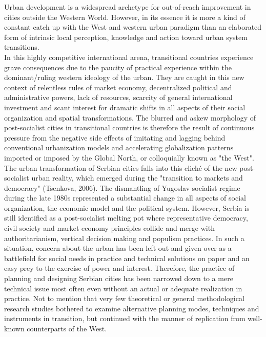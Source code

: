 \documentclass[11pt]{report}
\begin{document}
Urban development is a widespread archetype for out-of-reach improvement in cities outside the Western World. However, in its essence it is more a kind of constant catch up with the West and western urban paradigm than an elaborated form of intrinsic local perception, knowledge and action toward urban system transitions. 
\\
In this highly competitive international arena, transitional countries experience grave consequences due to the paucity of practical experience within the dominant/ruling western ideology of the urban. They are caught in this new context of relentless rules of market economy, decentralized political and administrative powers, lack of resources, scarcity of general international investment and scant interest for dramatic shifts in all aspects of their social organization and spatial transformations. The blurred and askew morphology of post-socialist cities in transitional countries is therefore the result of continuous pressure from the negative side effects of imitating and lagging behind conventional urbanization models and accelerating globalization patterns imported or imposed by the Global North, or colloquially known as "the West".
\\
The urban transformation of Serbian cities falls into this cliché of the new post-socialist urban reality, which emerged during the "transition to markets and democracy" (Tsenkova, 2006). The dismantling of Yugoslav socialist regime during the late 1980s represented a substantial change in all aspects of social organization, the economic model and the political system. However, Serbia is still identified as a post-socialist melting pot where representative democracy, civil society and market economy principles collide and merge with authoritarianism, vertical decision making and populism practices. In such a situation, concern about the urban has been left out and given over as a battlefield for social needs in practice and technical solutions on paper and an easy prey to the exercise of power and interest. Therefore, the practice of planning and designing Serbian cities has been narrowed down to a mere technical issue most often even without an actual or adequate realization in practice. Not to mention that very few theoretical or general methodological research studies bothered to examine alternative planning modes, techniques and instruments in transition, but continued with the manner of replication from well-known counterparts of the West.
\\
\end{document}
